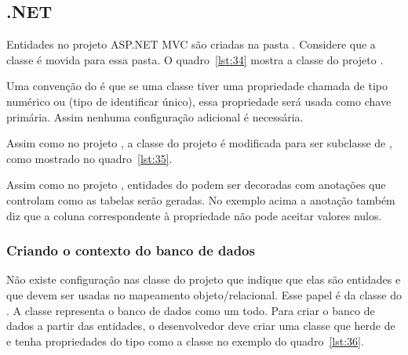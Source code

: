 \subsection{.NET}

Entidades no projeto ASP.NET MVC são criadas na pasta . Considere que a classe  é movida para essa pasta. O quadro~\ref{lst:34} mostra a classe  do projeto .


Uma convenção do  é que se uma classe tiver uma propriedade chamada  de tipo numérico ou  (tipo de identificar único), essa propriedade será usada como chave primária. Assim nenhuma configuração adicional é necessária.

Assim como no projeto , a classe  do projeto  é modificada para ser subclasse de , como mostrado no quadro~\ref{lst:35}.


Assim como no projeto , entidades do  podem ser decoradas com anotações que controlam como as tabelas serão geradas. No exemplo acima a anotação  também diz que a coluna correspondente à propriedade  não pode aceitar valores nulos.

\subsubsection{Criando o contexto do banco de dados}

Não existe configuração nas classe do projeto  que indique que elas são entidades e que devem ser usadas no mapeamento objeto/relacional. Esse papel é da classe  do . A classe  representa o banco de dados como um todo. Para criar o banco de dados a partir das entidades, o desenvolvedor deve criar uma classe que herde de  e tenha propriedades do tipo  como a classe  no exemplo do quadro~\ref{lst:36}. 


